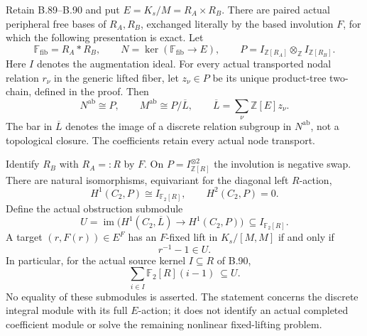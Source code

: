 \label{stmt:B91}
Retain B.89--B.90 and put $E=K_s/M=R_A\times R_B$.
There are paired actual peripheral free bases of $R_A,R_B$,
exchanged literally by the based involution $F$, for which the following
presentation is exact. Let
\[
 \mathbb F_{\mathrm{fib}}=R_A*R_B,\qquad
 N=\ker(\mathbb F_{\mathrm{fib}}\to E),\qquad
 P=I_{\mathbb Z[R_A]}\otimes_{\mathbb Z} I_{\mathbb Z[R_B]}.
\]
Here $I$ denotes the augmentation ideal. For every actual transported
nodal relation $r_\nu$ in the generic lifted fiber, let $z_\nu\in P$
be its unique product-tree two-chain, defined in the proof. Then
\begin{equation}\label{eq:B91-presentation}
 N^{\mathrm{ab}}\cong P,\qquad
 M^{\mathrm{ab}}\cong P/\overline L,\qquad
 \overline L=\sum_\nu\mathbb Z[E]z_\nu.
\end{equation}
The bar in $\overline L$ denotes the image of a discrete relation
subgroup in $N^{\mathrm{ab}}$, not a topological closure.
The coefficients retain every actual node transport.

Identify $R_B$ with $R_A=:R$ by $F$. On $P=I_{\mathbb Z[R]}^{\otimes2}$
the involution is negative swap. There are natural isomorphisms,
equivariant for the diagonal left $R$-action,
\begin{equation}\label{eq:B91-Tate}
 H^1(C_2,P)\cong I_{\mathbb F_2[R]},\qquad H^2(C_2,P)=0.
\end{equation}
Define the actual obstruction submodule
\begin{equation}\label{eq:B91-U}
 U=\operatorname{im}\bigl(H^1(C_2,\overline L)
                            \longrightarrow H^1(C_2,P)\bigr)
       \ \subseteq I_{\mathbb F_2[R]}.
\end{equation}
A target $(r,F(r))\in E^F$ has an $F$-fixed lift in
$K_s/[M,M]$ if and only if
\begin{equation}\label{eq:B91-criterion}
                         r^{-1}-1\in U.
\end{equation}
In particular, for the actual source kernel $I\subseteq R$ of B.90,
\[
 \sum_{i\in I}\mathbb F_2[R](i-1)\ \subseteq U.
\]
No equality of these submodules is asserted. The statement concerns
the discrete integral module with its full $E$-action; it does not
identify an actual completed coefficient module or solve the
remaining nonlinear fixed-lifting problem.

